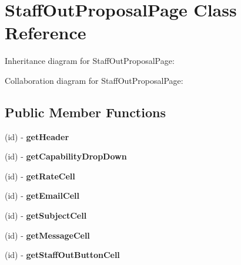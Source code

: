 \hypertarget{interface_staff_out_proposal_page}{
\section{\-Staff\-Out\-Proposal\-Page \-Class \-Reference}
\label{interface_staff_out_proposal_page}
}


\-Inheritance diagram for \-Staff\-Out\-Proposal\-Page\-:


\-Collaboration diagram for \-Staff\-Out\-Proposal\-Page\-:
\subsection*{\-Public \-Member \-Functions}
\begin{DoxyCompactItemize}
\item 
\hypertarget{interface_staff_out_proposal_page_aa4cb00ac0fe4d37a20f0369a08b6832f}{
(id) -\/ {\bfseries get\-Header}}
\label{interface_staff_out_proposal_page_aa4cb00ac0fe4d37a20f0369a08b6832f}

\item 
\hypertarget{interface_staff_out_proposal_page_ae0d97af12f33075886bf0bfffe17c85f}{
(id) -\/ {\bfseries get\-Capability\-Drop\-Down}}
\label{interface_staff_out_proposal_page_ae0d97af12f33075886bf0bfffe17c85f}

\item 
\hypertarget{interface_staff_out_proposal_page_aafa60a47d1a2dd5abd28ee3d5cd171d6}{
(id) -\/ {\bfseries get\-Rate\-Cell}}
\label{interface_staff_out_proposal_page_aafa60a47d1a2dd5abd28ee3d5cd171d6}

\item 
\hypertarget{interface_staff_out_proposal_page_a36c7568603c76a2d6df68374426749fc}{
(id) -\/ {\bfseries get\-Email\-Cell}}
\label{interface_staff_out_proposal_page_a36c7568603c76a2d6df68374426749fc}

\item 
\hypertarget{interface_staff_out_proposal_page_ab1251adfd51ac73c5855cdf371b86c03}{
(id) -\/ {\bfseries get\-Subject\-Cell}}
\label{interface_staff_out_proposal_page_ab1251adfd51ac73c5855cdf371b86c03}

\item 
\hypertarget{interface_staff_out_proposal_page_aa7f22b811203acc2cb12e700690021db}{
(id) -\/ {\bfseries get\-Message\-Cell}}
\label{interface_staff_out_proposal_page_aa7f22b811203acc2cb12e700690021db}

\item 
\hypertarget{interface_staff_out_proposal_page_ab5a430aaca5582169593432da9479e7a}{
(id) -\/ {\bfseries get\-Staff\-Out\-Button\-Cell}}
\label{interface_staff_out_proposal_page_ab5a430aaca5582169593432da9479e7a}

\end{DoxyCompactItemize}
